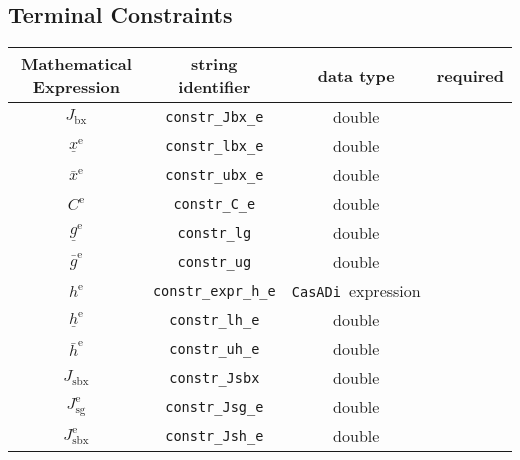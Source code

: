\documentclass{article}
\newcommand{\code}[1]{\texttt{#1}}
\newcommand{\casadi}{\texttt{CasADi}}
\newcommand{\ind}[1]{_{\textrm{#1}}}
\newcommand{\terminal}{^{\textrm{e}}}
\begin{document}
\subsection{Terminal Constraints}
\begin{table}[h]
	\centering
	\begin{tabular}{|c|c|c|c|}
		\toprule
		Mathematical Expression & string identifier & data type  & required \\ \midrule
		$J_{\textrm{bx}}$ & \code{constr\_Jbx\_e}    & double   & \optional   \\
		$\underline{x}\terminal $    & \code{constr\_lbx\_e}     & double  & \optional   \\
		$\bar{x}\terminal $         & \code{constr\_ubx\_e}     & double   & \optional  \\ \midrule
		$ C\terminal $ & \code{constr\_C\_e}    & double   & \optional   \\
		$\underline{g}\terminal $    & \code{constr\_lg}     & double   & \optional   \\
		$\bar{g}\terminal $         & \code{constr\_ug}     & double   & \optional  \\ \midrule
		$ h\terminal $ & \code{constr\_expr\_h\_e}    & \casadi~expression   & \optional  \\
		$\underline{h}\terminal $    & \code{constr\_lh\_e}     & double   & \optional   \\
		$\bar{h}\terminal $         & \code{constr\_uh\_e}     & double  & \optional   \\ \midrule
		$ J\ind{sbx} $ & \code{constr\_Jsbx} & double  & \optional \\
		$ J\ind{sg}\terminal $ & \code{constr\_Jsg\_e} & double & \optional  \\
		$ J\ind{sbx}\terminal $ & \code{constr\_Jsh\_e} & double  & \optional  \\
		\bottomrule
	\end{tabular}
\end{table}
\end{document}
